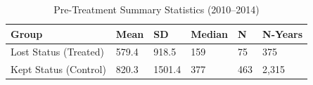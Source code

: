 \begin{table}[!h]
\centering
\caption{\label{tab:tab:sumstats}Pre-Treatment Summary Statistics (2010--2014)}
\centering
\begin{tabular}[t]{llllll}
\toprule
Group & Mean & SD & Median & N & N-Years\\
\midrule
Lost Status (Treated) & 579.4 & 918.5 & 159 & 75 & 375\\
Kept Status (Control) & 820.3 & 1501.4 & 377 & 463 & 2,315\\
\bottomrule
\end{tabular}
\end{table}
